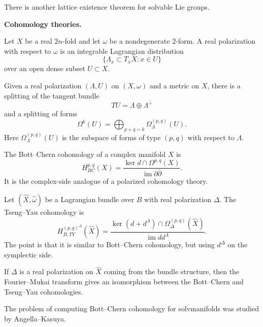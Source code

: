 \begin{theorem}
\label{theorem-lattice-existence}
There is another lattice existence
theorem for solvable Lie groups.
\end{theorem}

\medskip\noindent
{\bf Cohomology theories.}

\begin{definition}
\label{definition-real-polarization}
Let $X$ be a real $2n$-fold and let
$\omega$ be a nondegenerate $2$-form.
A real polarization with respect to
$\omega$ is an integrable Lagrangian
distribution
$$
\{\Lambda_x\subset T_xX:x\in U\}
$$
over an open dense subset $U\subset X$.

Given a real polarization
$(\Lambda,U)$ on $(X,\omega)$ and a
metric on $X$, there is a splitting
of the tangent bundle
$$
TU=\Lambda\oplus\Lambda^\perp
$$
and a splitting of forms
$$
\Omega^k(U)
=\bigoplus_{p+q=k}
\Omega_\Lambda^{(p,q)}(U).
$$
Here $\Omega_\Lambda^{(p,q)}(U)$ is
the subspace of forms of type
$(p,q)$ with respect to $\Lambda$.
\end{definition}

\begin{definition}
\label{definition-bott-chern}
The Bott--Chern cohomology of a
complex manifold $X$ is
$$
H^{p,q}_{BC}(X)
=\frac{
\ker d\cap\Omega^{p,q}(X)
}{
\operatorname{im}\partial\bar\partial
}.
$$
It is the complex-side analogue of a
polarized cohomology theory.
\end{definition}

\begin{definition}
\label{definition-tseng-yau}
Let
$(\widehat X,\widehat\omega)$ be a
Lagrangian bundle over $B$ with real
polarization $\Delta$.
The Tseng--Yau cohomology is
$$
H^{(p,q)^\Delta}_{B,TY}(\widehat X)
=\frac{
\ker(d+d^\Lambda)\cap
\Omega_\Delta^{(p,q)}(\widehat X)
}{
\operatorname{im}dd^\Lambda
}.
$$
The point is that it is similar to
Bott--Chern cohomology, but using
$d^\Delta$ on the symplectic side.
\end{definition}

\begin{theorem}
\label{theorem-ty-bc-iso}
If $\Delta$ is a real polarization on
\(\widehat X\) coming from the bundle
structure, then the Fourier--Mukai
transform gives an isomorphism
between the Bott--Chern and
Tseng--Yau cohomologies.
\end{theorem}

\medskip\noindent
The problem of computing Bott--Chern
cohomology for solvmanifolds was
studied by Angella--Kasuya.

